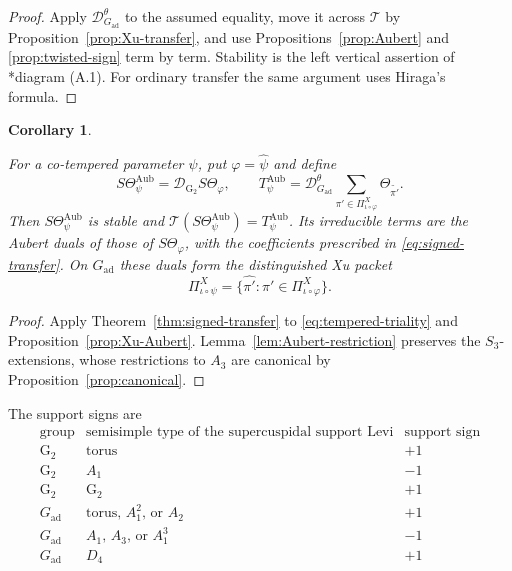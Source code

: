 \documentclass[12pt]{amsart}
\theoremstyle{definition}
\theoremstyle{plain}
\newtheorem{corollary}[definition]{Corollary}
\theoremstyle{remark}
\numberwithin{equation}{section}
\newcommand{\rG}{\mathrm{G}}
\begin{document}
\begin{proof}
Apply $\mathcal D_{G_{\mathrm{ad}}}^\theta$ to the assumed equality, move it across
$\mathcal T$ by Proposition~\ref{prop:Xu-transfer}, and use
Propositions~\ref{prop:Aubert} and \ref{prop:twisted-sign} term by term.
Stability is the left vertical assertion of
\cite{Xu2017-MoeglinParametrizationArthurPackets}*{diagram (A.1)}.
For ordinary transfer the same argument uses Hiraga's formula.
\end{proof}

\begin{corollary}\label{cor:cotempered}

For a co-tempered parameter $\psi$, put $\varphi=\widehat\psi$ and
define
\[
 S\Theta_\psi^{\mathrm{Aub}}=\mathcal D_{\rG_2} S\Theta_\varphi,
 \qquad T_\psi^{\mathrm{Aub}}=
       \mathcal D_{G_{\mathrm{ad}}}^\theta\sum_{\pi'\in\Pi^X_{\iota\circ\varphi}}
                                      \Theta_{\widetilde{\pi'}}.
\]
Then $S\Theta_\psi^{\mathrm{Aub}}$ is stable and
$\mathcal T(S\Theta_\psi^{\mathrm{Aub}})=T_\psi^{\mathrm{Aub}}$.
Its irreducible terms are the Aubert duals of those of $S\Theta_\varphi$,
with the coefficients prescribed in \eqref{eq:signed-transfer}.
On $G_{\mathrm{ad}}$ these duals form the distinguished Xu packet
\[
 \Pi^X_{\iota\circ\psi}
       =\{\widehat{\pi'}:\pi'\in\Pi^X_{\iota\circ\varphi}\}.
\]
\end{corollary}

\begin{proof}
Apply Theorem~\ref{thm:signed-transfer} to
\eqref{eq:tempered-triality} and Proposition~\ref{prop:Xu-Aubert}.
Lemma~\ref{lem:Aubert-restriction} preserves the $S_3$-extensions,
whose restrictions to $A_3$ are canonical by
Proposition~\ref{prop:canonical}.
\end{proof}

The support signs are
\[
\begin{array}{c|c|c}
 \text{group}&\text{semisimple type of the supercuspidal support Levi}&\text{support sign}\\\hline
 {\rG_2}&\text{torus}&+1\\
 {\rG_2}&A_1&-1\\
 {\rG_2}&\rG_2&+1\\
 G_{\mathrm{ad}}&\text{torus, }A_1^2\text{, or }A_2&+1\\
 G_{\mathrm{ad}}&A_1\text{, }A_3\text{, or }A_1^3&-1\\
 G_{\mathrm{ad}}&D_4&+1
\end{array}
\]
\end{document}
